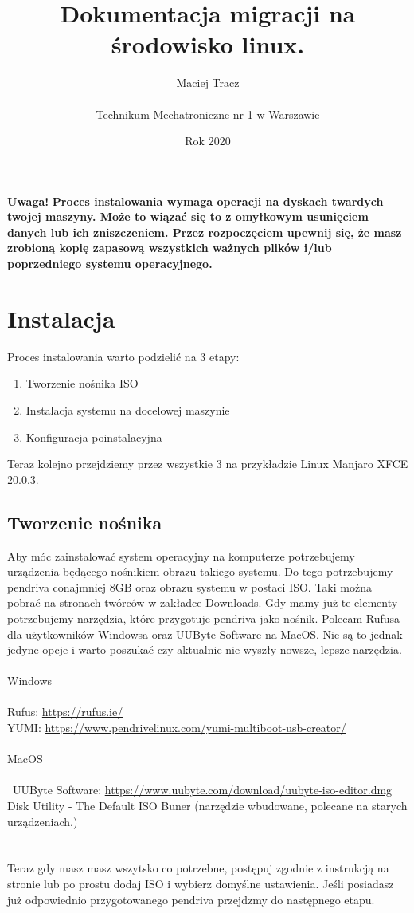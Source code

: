 \documentclass[10pt,a4paper]{article}
\begin{document}
\title{\Huge Dokumentacja migracji na środowisko linux.}
\author{Maciej Tracz \\\\Technikum Mechatroniczne nr 1 w Warszawie}
\date{Rok 2020}
\maketitle

\textbf{Uwaga!} \textbf{Proces instalowania wymaga operacji na dyskach twardych twojej maszyny. Może to wiązać się to z omyłkowym usunięciem danych lub ich zniszczeniem. Przez rozpoczęciem upewnij się, że masz zrobioną kopię zapasową wszystkich ważnych plików i/lub poprzedniego systemu operacyjnego.}

	\section{Instalacja}
	
Proces instalowania warto podzielić na 3 etapy:
\begin{enumerate}
\item Tworzenie nośnika ISO
\item Instalacja systemu na docelowej maszynie
\item Konfiguracja poinstalacyjna\\
\end{enumerate}	
Teraz kolejno przejdziemy przez wszystkie 3 na przykładzie Linux Manjaro XFCE 20.0.3.
		\subsection{Tworzenie nośnika}
Aby móc zainstalować system operacyjny na komputerze potrzebujemy urządzenia będącego nośnikiem obrazu takiego systemu. Do tego potrzebujemy pendriva conajmniej 8GB oraz obrazu systemu w postaci ISO. Taki można pobrać na stronach twórców w zakładce Downloads. Gdy mamy już te elementy potrzebujemy narzędzia, które przygotuje pendriva jako nośnik. Polecam Rufusa dla użytkowników Windowsa oraz UUByte Software na MacOS. Nie są to jednak jedyne opcje i warto poszukać czy aktualnie nie wyszły nowsze, lepsze narzędzia.\\\\Windows\\\\Rufus: \url{https://rufus.ie/}\\ YUMI: \url{https://www.pendrivelinux.com/yumi-multiboot-usb-creator/}\\\\MacOS\\\\\ UUByte Software: \url{https://www.uubyte.com/download/uubyte-iso-editor.dmg}\\Disk Utility - The Default ISO Buner (narzędzie wbudowane, polecane na starych urządzeniach.)\\\\\\ Teraz gdy masz masz wszytsko co potrzebne, postępuj zgodnie z instrukcją na stronie lub po prostu dodaj ISO i wybierz domyślne ustawienia. Jeśli posiadasz już odpowiednio przygotowanego pendriva przejdzmy do następnego etapu.
		
\end{document}

